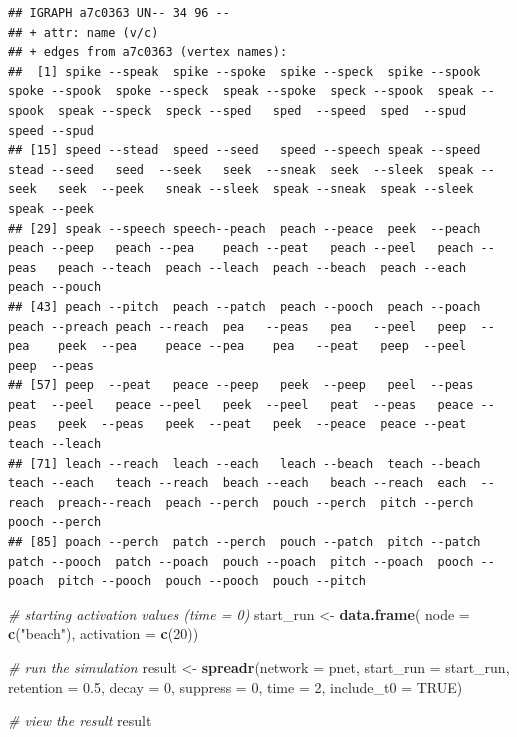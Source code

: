 \documentclass[
]{book}
\newenvironment{Shaded}{\begin{snugshade}}{\end{snugshade}}
\newcommand{\AttributeTok}[1]{\textcolor[rgb]{0.13,0.29,0.53}{#1}}
\newcommand{\CommentTok}[1]{\textcolor[rgb]{0.56,0.35,0.01}{\textit{#1}}}
\newcommand{\ConstantTok}[1]{\textcolor[rgb]{0.56,0.35,0.01}{#1}}
\newcommand{\DecValTok}[1]{\textcolor[rgb]{0.00,0.00,0.81}{#1}}
\newcommand{\FloatTok}[1]{\textcolor[rgb]{0.00,0.00,0.81}{#1}}
\newcommand{\FunctionTok}[1]{\textcolor[rgb]{0.13,0.29,0.53}{\textbf{#1}}}
\newcommand{\NormalTok}[1]{#1}
\newcommand{\OtherTok}[1]{\textcolor[rgb]{0.56,0.35,0.01}{#1}}
\newcommand{\StringTok}[1]{\textcolor[rgb]{0.31,0.60,0.02}{#1}}
\begin{document}
\begin{verbatim}
## IGRAPH a7c0363 UN-- 34 96 -- 
## + attr: name (v/c)
## + edges from a7c0363 (vertex names):
##  [1] spike --speak  spike --spoke  spike --speck  spike --spook  spoke --spook  spoke --speck  speak --spoke  speck --spook  speak --spook  speak --speck  speck --sped   sped  --speed  sped  --spud   speed --spud  
## [15] speed --stead  speed --seed   speed --speech speak --speed  stead --seed   seed  --seek   seek  --sneak  seek  --sleek  speak --seek   seek  --peek   sneak --sleek  speak --sneak  speak --sleek  speak --peek  
## [29] speak --speech speech--peach  peach --peace  peek  --peach  peach --peep   peach --pea    peach --peat   peach --peel   peach --peas   peach --teach  peach --leach  peach --beach  peach --each   peach --pouch 
## [43] peach --pitch  peach --patch  peach --pooch  peach --poach  peach --preach peach --reach  pea   --peas   pea   --peel   peep  --pea    peek  --pea    peace --pea    pea   --peat   peep  --peel   peep  --peas  
## [57] peep  --peat   peace --peep   peek  --peep   peel  --peas   peat  --peel   peace --peel   peek  --peel   peat  --peas   peace --peas   peek  --peas   peek  --peat   peek  --peace  peace --peat   teach --leach 
## [71] leach --reach  leach --each   leach --beach  teach --beach  teach --each   teach --reach  beach --each   beach --reach  each  --reach  preach--reach  peach --perch  pouch --perch  pitch --perch  pooch --perch 
## [85] poach --perch  patch --perch  pouch --patch  pitch --patch  patch --pooch  patch --poach  pouch --poach  pitch --poach  pooch --poach  pitch --pooch  pouch --pooch  pouch --pitch
\end{verbatim}

\begin{Shaded}
\begin{Highlighting}[]
\CommentTok{\# starting activation values (time = 0)}
\NormalTok{start\_run }\OtherTok{\textless{}{-}} \FunctionTok{data.frame}\NormalTok{(}
  \AttributeTok{node =} \FunctionTok{c}\NormalTok{(}\StringTok{"beach"}\NormalTok{),}
  \AttributeTok{activation =} \FunctionTok{c}\NormalTok{(}\DecValTok{20}\NormalTok{))}

\CommentTok{\# run the simulation}
\NormalTok{result }\OtherTok{\textless{}{-}} \FunctionTok{spreadr}\NormalTok{(}\AttributeTok{network =}\NormalTok{ pnet, }\AttributeTok{start\_run =}\NormalTok{ start\_run, }
                  \AttributeTok{retention =} \FloatTok{0.5}\NormalTok{, }\AttributeTok{decay =} \DecValTok{0}\NormalTok{, }\AttributeTok{suppress =} \DecValTok{0}\NormalTok{,}
                  \AttributeTok{time =} \DecValTok{2}\NormalTok{, }\AttributeTok{include\_t0 =} \ConstantTok{TRUE}\NormalTok{)}

\CommentTok{\# view the result }
\NormalTok{result}
\end{Highlighting}
\end{Shaded}
\end{document}
